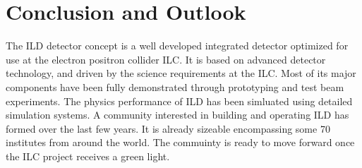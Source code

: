 \documentclass[%
 amsmath,amssymb,
 aps,
]{revtex4-1}
\begin{document}
\section{Conclusion and Outlook}
The ILD detector concept is a well developed integrated detector optimized for use at the electron positron collider ILC. It is based on advanced detector technology, and driven by the science requirements at the ILC. Most of its major components have been fully demonstrated through prototyping and test beam experiments. The physics performance of ILD has been simluated using detailed simulation systems. A community interested in building and operating ILD has formed over the last few years. It is already sizeable encompassing some 70 institutes from around the world. The commuinty is ready to move forward once the ILC project receives a green light. 




\end{document}
